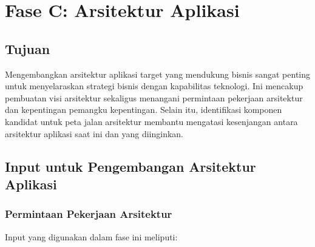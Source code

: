 \chapter{Fase C: Arsitektur Aplikasi}

\section{Tujuan}
Mengembangkan arsitektur aplikasi target yang mendukung bisnis sangat penting untuk menyelaraskan strategi bisnis dengan kapabilitas teknologi. Ini mencakup pembuatan visi arsitektur sekaligus menangani permintaan pekerjaan arsitektur dan kepentingan pemangku kepentingan. Selain itu, identifikasi komponen kandidat untuk peta jalan arsitektur membantu mengatasi kesenjangan antara arsitektur aplikasi saat ini dan yang diinginkan.

\section{Input untuk Pengembangan Arsitektur Aplikasi}

\subsection{Permintaan Pekerjaan Arsitektur}
Input yang digunakan dalam fase ini meliputi:

